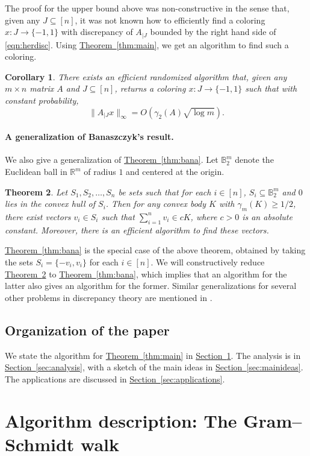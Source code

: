 \documentclass[11pt]{article}
\numberwithin{equation}{section}
\newtheorem{theorem}{Theorem}[section]
\newtheorem{corollary}[theorem]{Corollary}
\theoremstyle{definition}
\theoremstyle{plain}
\newcommand{\R}{\mathbb R}
\newcommand{\expref}[2]{\hyperref[#2]{#1~\ref{#2}}}
\begin{document}
The proof for the upper bound above was non-constructive in the sense that, given any $J\subseteq [n]$, it was not known how to efficiently find a coloring $x:J\rightarrow\{-1,1\}$ with discrepancy of $A_{|J}$ bounded by the right hand side of \eqref{eqn:herdisc}.
Using \expref{Theorem}{thm:main}, we get an algorithm to find such a coloring.
\begin{corollary}
\label{thm:herdisc}
There exists an efficient randomized algorithm that, given any $m\times n$ matrix $A$ and $J\subseteq[n]$, returns a coloring $x:J\rightarrow\{-1,1\}$ such that with constant probability,
\[ \| A_{|J} x\|_{\infty} = O(\gamma_2(A)\sqrt{\log m}).\]
\end{corollary}
\paragraph{A generalization of Banaszczyk's result.} We also give a generalization of \expref{Theorem}{thm:bana}. Let
$\mathbb{B}_2^m$ denote the Euclidean ball in $\R^m$ of radius $1$ and centered at the origin.
\begin{theorem}
\label{thm:genbana}
Let $S_1,S_2,\dots,S_n$  be sets such that for each $i\in [n]$, $S_i \subseteq \mathbb{B}_2^m$ and $0$ lies in the convex hull of $S_i$. Then for any convex body $K$ with $\gamma_m(K)\ge 1/2$, there exist vectors $v_i\in S_i$ such that
$\sum_{i=1}^n v_i \in cK$,
where $c>0$ is an absolute constant. Moreover, there is an efficient algorithm to find these vectors.
\end{theorem}
\expref{Theorem}{thm:bana} is the special case of the above theorem, obtained by taking the sets 
%
$S_i=\{-v_i,v_i\}$ for each $i\in [n]$. We will constructively reduce \expref{Theorem}{thm:genbana} to \expref{Theorem}{thm:bana}, which implies that an algorithm for the latter also gives an algorithm for the former. Similar generalizations for several other problems in discrepancy
theory  %
are mentioned in \cite{B08}.

\subsection{Organization of the paper}
We state the algorithm for \expref{Theorem}{thm:main} in \expref{Section}{sec:algorithm}. The analysis is in \expref{Section}{sec:analysis}, with a  sketch of the main ideas in \expref{Section}{sec:mainideas}. The applications are discussed in \expref{Section}{sec:applications}.


\section{Algorithm description: The Gram--Schmidt walk}
\label{sec:algorithm}
\end{document}
